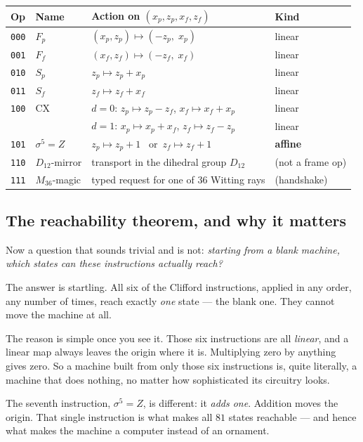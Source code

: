 \begin{spec}
\begin{center}\small
\begin{tabular}{@{}llll@{}}
\toprule
\textbf{Op} & \textbf{Name} & \textbf{Action on $(x_p,z_p,x_f,z_f)$} & \textbf{Kind}\\
\midrule
\texttt{000} & $F_p$ & $(x_p,z_p)\mapsto(-z_p,\;x_p)$              & linear \\
\texttt{001} & $F_f$ & $(x_f,z_f)\mapsto(-z_f,\;x_f)$              & linear \\
\texttt{010} & $S_p$ & $z_p\mapsto z_p+x_p$                        & linear \\
\texttt{011} & $S_f$ & $z_f\mapsto z_f+x_f$                        & linear \\
\texttt{100} & $\mathrm{CX}$ & $d{=}0$: $z_p\mapsto z_p-z_f$, $x_f\mapsto x_f+x_p$
                              & linear \\
             &               & $d{=}1$: $x_p\mapsto x_p+x_f$, $z_f\mapsto z_f-z_p$
                              & linear \\
\texttt{101} & $\sigma^5{=}Z$ & $z_p\mapsto z_p+1$ \ or\  $z_f\mapsto z_f+1$
                              & \textbf{affine} \\
\texttt{110} & $D_{12}$-mirror & transport in the dihedral group $D_{12}$ & (not a frame op)\\
\texttt{111} & $M_{36}$-magic & typed request for one of $36$ Witting rays & (handshake)\\
\bottomrule
\end{tabular}
\end{center}
\end{spec}

\subsection{The reachability theorem, and why it matters}

\begin{plain}
Now a question that sounds trivial and is not: \emph{starting from a blank machine, which
states can these instructions actually reach?}

The answer is startling. All six of the Clifford instructions, applied in any order, any
number of times, reach exactly \emph{one} state --- the blank one. They cannot move the
machine at all.

The reason is simple once you see it. Those six instructions are all \emph{linear}, and a
linear map always leaves the origin where it is. Multiplying zero by anything gives zero.
So a machine built from only those six instructions is, quite literally, a machine that
does nothing, no matter how sophisticated its circuitry looks.

The seventh instruction, $\sigma^5=Z$, is different: it \emph{adds one}. Addition moves
the origin. That single instruction is what makes all $81$ states reachable --- and hence
what makes the machine a computer instead of an ornament.
\end{plain}

